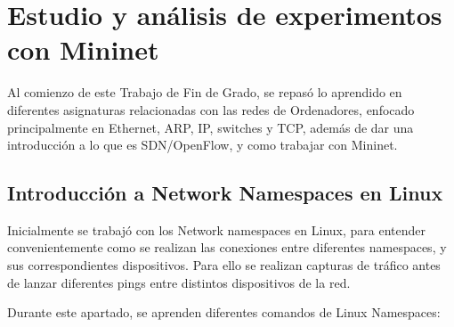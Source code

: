 \documentclass[a4paper, 12pt]{book}
\begin{document}
	\chapter{Estudio y análisis de experimentos con Mininet} %
	\label{chap:mininet} %
	
	Al comienzo de este Trabajo de Fin de Grado, se repasó lo aprendido en diferentes asignaturas relacionadas con las redes de Ordenadores, enfocado principalmente en Ethernet, ARP, IP, switches y TCP, además de dar una introducción a lo que es SDN/OpenFlow, y como trabajar con Mininet.

	
	\section{Introducción a Network Namespaces en Linux}
	
	Inicialmente se trabajó con los Network namespaces en Linux, para entender convenientemente como se realizan las conexiones entre diferentes namespaces, y sus correspondientes dispositivos. Para ello se realizan capturas de tráfico antes de lanzar diferentes pings entre distintos dispositivos de la red.
	
	Durante este apartado, se aprenden diferentes comandos de Linux Namespaces:
	
\end{document}
